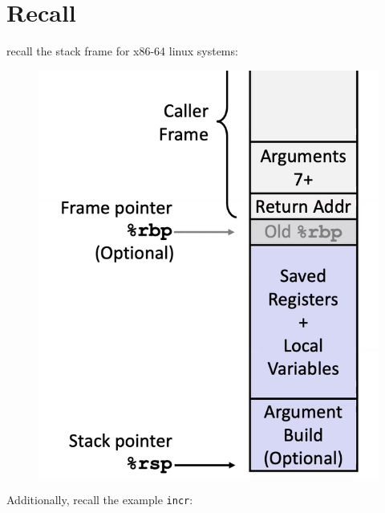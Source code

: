 \documentclass[12pt]{book}
\title{\coursetitle\linebreak\lecturename}
\author{\\Cain Susko\\ 
           \\ \\ \\
      Queen's University 
    \\School of Computing\\}
\begin{document}
\begin{titlepage}
        \maketitle
\end{titlepage}


\section*{Recall}
recall the stack frame for x86-64 linux systems:
\begin{figure}[h]
        \centering
        \includegraphics[scale = 0.4]{./figures/linuxstack}
\end{figure}

Additionally, recall the example \texttt{incr}:
\end{document}
